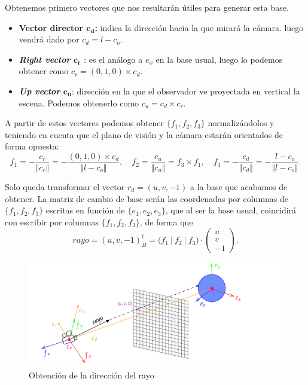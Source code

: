 Obtenemos primero vectores que nos resultarán útiles para generar esta base.

\begin{itemize}
    \item \textbf{Vector director $\boldsymbol{c_d}$:} indica la dirección hacia la que mirará la cámara. luego vendrá dado por $c_d = l-c_o$.
    \item \textbf{\textit{Right vector} $\boldsymbol{c_r}$ }: es el análogo a $e_x$ en la base usual, luego lo podemos obtener como $c_r = (0,1,0)\times c_d$.
    \item \textbf{\textit{Up vector} $\boldsymbol{c_u}$}: dirección en la que el observador ve proyectada en vertical la escena. Podemos obtenerlo como $c_u = c_d\times c_r$.
\end{itemize}

A partir de estos vectores podemos obtener $\{f_1,f_2,f_3\}$ normalizándolos y teniendo en cuenta que el plano de visión y la cámara estarán orientados de forma opuesta:
\begin{equation*}
    f_1 = -\frac{c_r}{\Vert c_r\Vert} = -\frac{(0,1,0)\times c_d}{\Vert l-c_o\Vert},\quad 
    f_2 = \frac{c_u}{\Vert c_u\Vert } = f_3\times f_1, \quad
    f_3 = -\frac{c_d}{\Vert c_d\Vert} = -\frac{l-c_o}{\Vert l-c_o\Vert}. 
\end{equation*}

Solo queda transformar el vector $r_d = (u,v,-1)$ a la base que acabamos de obtener. La matriz de cambio de base serán las coordenadas por columnas de $\{f_1,f_2,f_3\}$ escritas en función de $\{e_1,e_2,e_3\}$, que al ser la base usual, coincidirá con escribir por columnas $\{f_1,f_2,f_3\}$, de forma que
\begin{equation*}
    rayo = (u,v,-1)_{B}^t = \big(f_1\ \vert\  f_2\  \vert\  f_3\big) \cdot \begin{pmatrix}
        u\\
        v\\
        -1
    \end{pmatrix}.
\end{equation*}

\begin{figure}[ht!]
    \centering
    \includegraphics[width=\textwidth]{Plantilla-TFG-master/img/raydir_fix.png}
    \caption{Obtención de la dirección del rayo}
    \label{fig:raydir}
\end{figure}

